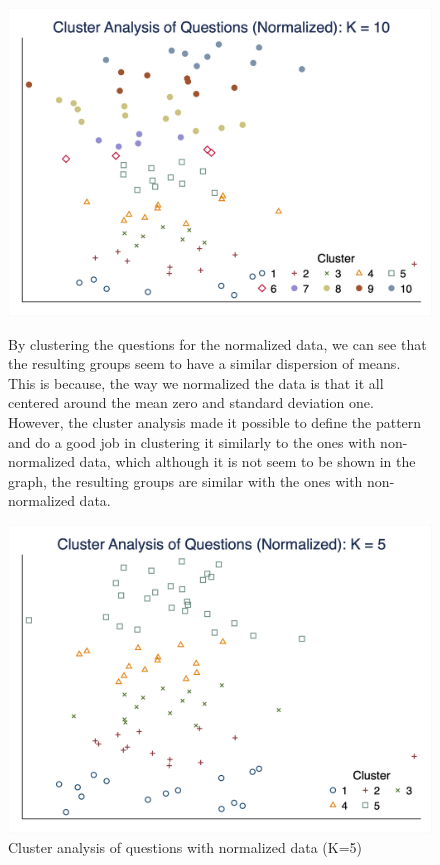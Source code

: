 \documentclass[10pt,leqno]{article}
\begin{document}
\begin{figure}  [h!]
\begin{center}
\includegraphics[scale=0.15]{CA_QuestionK10_NOR.png}
\end{center}
By clustering the questions for the normalized data, we can see that the resulting groups seem to have a similar dispersion of means. This is because, the way we normalized the data is that it all centered around the mean zero and standard deviation one. However, the cluster analysis made it possible to define the pattern and do a good job in clustering it similarly to the ones with non-normalized data, which although it is not seem to be shown in the graph, the resulting groups are similar with the ones with non-normalized data. 
\end{figure}  

\begin{figure}  [h!]
\begin{center}
\caption{Cluster analysis of questions with normalized data (K=5)}
\includegraphics[scale=0.25]{CA_QuestionK5_NOR.png}
\end{center}
\end{figure}  
\end{document}
